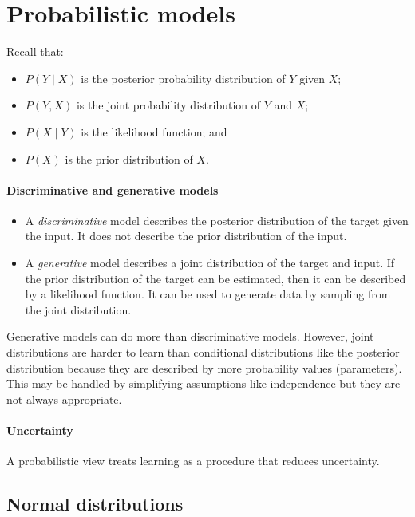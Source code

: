 \section{Probabilistic models}
\label{sec:9:probabilistic-models}

Recall that:
\begin{itemize}
  \item $P(Y \mid X)$ is the posterior probability distribution of $Y$ given $X$;
  \item $P(Y, X)$ is the joint probability distribution of $Y$ and $X$;
  \item $P(X \mid Y)$ is the likelihood function; and
  \item $P(X)$ is the prior distribution of $X$.
\end{itemize}

\paragraph{Discriminative and generative models}

\begin{itemize}
  \item A \textit{discriminative} model describes the posterior distribution of
        the target given the input.
        It does not describe the prior distribution of the input.
  \item A \textit{generative} model describes a joint distribution of the target
        and input.
        If the prior distribution of the target can be estimated, then it can
        be described by a likelihood function.
        It can be used to generate data by sampling from the joint distribution.
\end{itemize}

Generative models can do more than discriminative models.
However, joint distributions are harder to learn than conditional distributions
like the posterior distribution because they are described by more probability
values (parameters).
This may be handled by simplifying assumptions like independence but they are
not always appropriate.

\paragraph{Uncertainty}

A probabilistic view treats learning as a procedure that reduces uncertainty.

\subsection{Normal distributions}

